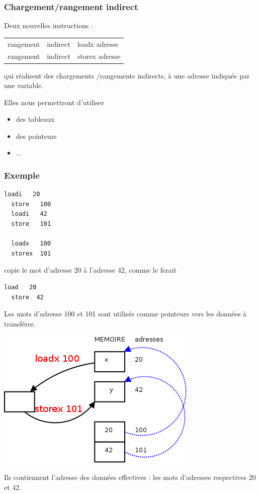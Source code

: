 \begin{frame}[containsverbatim]
  \frametitle{Chargement/rangement indirect}


Deux nouvelles instructions :
\begin{center}
\begin{tabular}{|rll|}
\hline
rangement  &indirect & \alert{loadx adresse} \\
rangement  &indirect & \alert{storex adresse} \\
\hline
\end{tabular}
\end{center}

qui réalisent des chargements /rangements \alert{indirects},
à une adresse indiquée par une variable.
\vspace{1cm}

Elles nous permettront d'utiliser
\begin{itemize}
\item des tableaux
\item des pointeurs
\item ...
\end{itemize}
\end{frame}

\begin{frame}[containsverbatim]
\frametitle{Exemple}

  \begin{multicols*}{2}
\begin{lstlisting}[frame=single]
  loadi   20
  store   100
  loadi   42
  store   101

  loadx   100  
  storex  101  
\end{lstlisting}

copie le mot d'adresse 20 à l'adresse 42, comme le ferait
\begin{lstlisting}[frame=single]
  load   20
  store  42  
\end{lstlisting}

\break
Les mots d'adresse 100 et 101 sont utilisés comme \alert{pointeurs}
vers les données à transférer.

\includegraphics[width=0.8\linewidth]{figures/indirect}

Ils contiennent l'\alert{adresse des données} effectives : les mots d'adresses respectives 20 et 42.


  \end{multicols*}
\end{frame}

